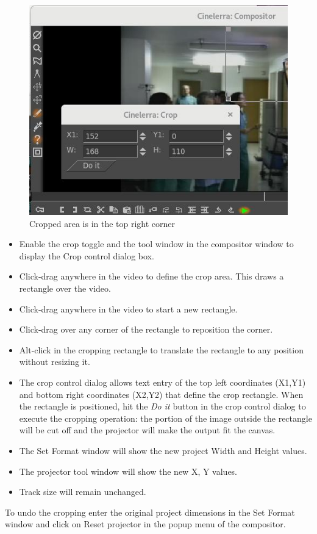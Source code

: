 \begin{figure}[htpb]
    \centering
    \includegraphics[width=0.5\linewidth]{images/cropped_area.png}
    \caption{Cropped area is in the top right corner}
    \label{fig:cropped_area}
\end{figure}

\begin{itemize}
    \item Enable the crop toggle and the tool window in the compositor window to display the Crop control dialog box.
    \item Click-drag anywhere in the video to define the crop area. This draws a rectangle over the video.
    \item Click-drag anywhere in the video to start a new rectangle.
    \item Click-drag over any corner of the rectangle to reposition the corner.
    \item Alt-click in the cropping rectangle to translate the rectangle to any position without resizing it.
    \item The crop control dialog allows text entry of the top left coordinates (X1,Y1) and bottom right coordinates (X2,Y2) that define the crop rectangle. 
        When the rectangle is positioned, hit the \emph{Do it} button in the crop control dialog to execute the cropping operation: the portion of the image outside  the rectangle will be cut off and the projector will make the output fit the canvas.
    \item The Set Format window will show the new project Width and Height values.
    \item The projector tool window will show the new X, Y values.
    \item Track size will remain unchanged.
\end{itemize}
 
To undo the cropping enter the original project dimensions in the Set Format window and click on Reset projector in the popup menu of the compositor.

